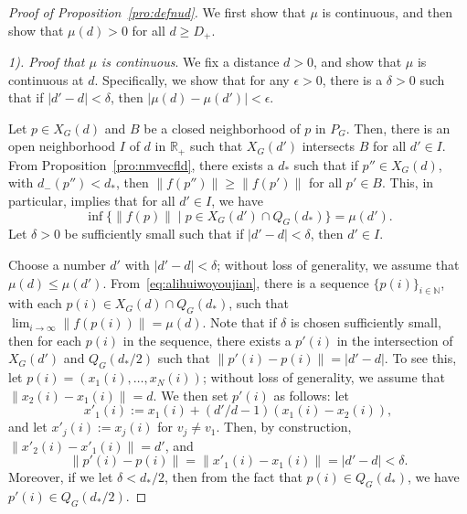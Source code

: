 \documentclass[10pt,twocolumn,twoside]{IEEEtran}
\newcommand{\R}{\mathbb{R}}
\renewcommand{\(}{\left (}
\renewcommand{\)}{\right )}
\renewcommand{\;}{\,;\,}
\newcommand{\N}{\mathbb{N}}
\begin{document}
\begin{proof}[Proof of Proposition~\ref{pro:defnud}]
We first show that $\mu$ is continuous, and then show that $\mu(d) > 0$ for all $d\ge D_+$.

\noindent
{\it 1). Proof that $\mu$ is continuous}.  
We fix a distance $d>0$, and show that $\mu$ is continuous at $d$. Specifically, we show that for any $\epsilon > 0$, there is a $\delta > 0$ such that if $|d' - d|< \delta$, then 
$|\mu(d) - \mu(d')| < \epsilon$.
  
  

Let $p\in X_G(d)$ and  $B$ be a closed neighborhood of $p$ in $P_G$. Then, there is an open neighborhood $I$ of $d$ in $\R_+$ such that $X_G(d')$ intersects $B$ for all $d'\in I$. From Proposition~\ref{pro:nmvecfld}, there exists a $d_*$ such that if $p'' \in X_G(d)$, with $d_-(p'')< d_*$, then $\|f(p'')\| \ge \|f(p')\| $ for all $p'\in B$. 
This, in particular, implies that for all $d' \in I$, we have
\begin{equation}\label{eq:alihuiwoyoujian}
\inf\{ \|f(p)\| \mid p\in X_{G}(d') \cap Q_G(d_*) \} = \mu(d').
\end{equation}
Let $\delta>0$ be sufficiently small such that if $|d' - d| < \delta$, then $d'\in I$. 

 
Choose a number $d'$ with $|d' - d| < \delta$;  without loss of generality, we assume that $\mu(d) \le \mu(d')$. From~\eqref{eq:alihuiwoyoujian}, there is a sequence $\{p(i)\}_{i\in\N}$, with each $p(i)\in X_{G}(d)\cap Q_G(d_*)$,  such that
$
\lim_{i\to \infty} \|f(p(i))\| = \mu(d)
$. 
Note that if $\delta$ is chosen sufficiently small, then for each $p(i)$ in the sequence, there exists a $p'(i)$ in the intersection of $X_{G}(d')$ and $Q_G(d_*/ 2)$ such that 
$
\|p'(i) -p(i)\| = |d' - d|
$.  
To see this, let $p(i) = (x_1(i),\ldots, x_N(i))$; without loss of generality,  we assume that 
$\|x_2(i) - x_1(i)\| = d$. We then set $p'(i)$ as follows: let 
$$
x'_1(i) := x_1(i) + (d'/ d - 1) (x_1(i) - x_2(i)),
$$
and let $x'_j(i) := x_j(i) $ for $v_j \neq v_1$.  
Then, by construction, $\|x'_2(i) - x'_1(i)\| = d'$, and 
$$ \|p'(i) - p(i)\| = \|x'_1(i) - x_1(i)\| = |d' - d| < \delta.$$
Moreover, if we let $\delta < d_* /2$, then from the fact that $p(i)\in Q_G(d_*)$, we have $p'(i) \in Q_G(d_*/2)$. 





\end{proof}
\end{document}
